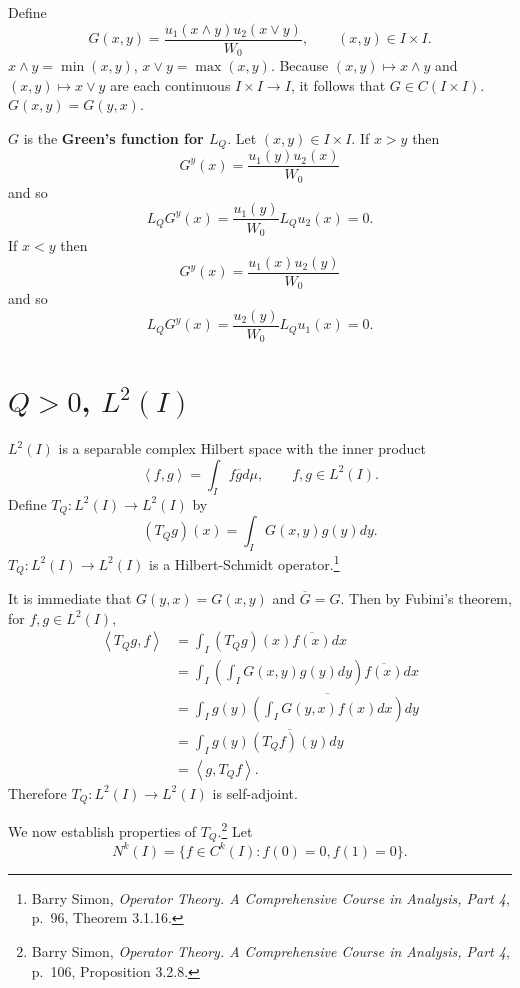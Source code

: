 \documentclass{article}
\newcommand{\inner}[2]{\left\langle #1, #2 \right\rangle}
\theoremstyle{definition}
\begin{document}
Define 
\[
G(x,y) = \frac{u_1(x \wedge y) u_2(x \vee y)}{W_0},\qquad (x,y) \in I \times I.
\]
$x \wedge y=\min(x,y)$, $x \vee y = \max(x,y)$. 
Because $(x,y) \mapsto x \wedge y$ and $(x,y) \mapsto x \vee y$ are each continuous
$I \times I \to I$, it follows that $G \in C(I \times I)$. 
$G(x,y) = G(y,x)$. 

$G$ is
the \textbf{Green's function for $L_Q$}.
Let $(x,y) \in I \times I$.
If $x>y$ then 
\[
G^y(x) = \frac{u_1(y) u_2(x)}{W_0}
\]
and so
\[
L_Q G^y(x) = \frac{u_1(y)}{W_0} L_Q u_2(x) = 0.
\]
If $x<y$ then
\[
G^y(x) = \frac{u_1(x)u_2(y)}{W_0}
\]
and so
\[
L_Q G^y(x) = \frac{u_2(y)}{W_0} L_Q u_1(x) = 0.
\]



\section{$Q>0$, $L^2(I)$}
$L^2(I)$ is a separable complex Hilbert space with the inner product
\[
\inner{f}{g} = \int_I f \overline{g} d\mu,\qquad f,g \in L^2(I).
\]
Define $T_Q:L^2(I) \to L^2(I)$ by
\[
(T_Q g)(x) = \int_I G(x,y) g(y) dy.
\]
$T_Q:L^2(I) \to L^2(I)$ is a Hilbert-Schmidt operator.\footnote{Barry Simon, {\em Operator Theory. A Comprehensive Course in Analysis, Part 4},
p.~96, Theorem 3.1.16.}

It is immediate that $G(y,x)=G(x,y)$ and $\overline{G}=G$.
Then 
by Fubini's theorem,  for $f,g \in L^2(I)$,
\begin{align*}
\inner{T_Qg}{f}&=\int_I (T_Q g)(x) \overline{f(x)} dx\\
&=\int_I \left( \int_I G(x,y) g(y) dy\right) \overline{f(x)} dx\\
&=\int_I g(y)\overline{\left(\int_I G(y,x) f(x) dx \right)} dy\\
&=\int_I g(y) \overline{(T_Q f)(y)}dy\\
&=\inner{g}{T_Q f}.
\end{align*}
Therefore $T_Q:L^2(I) \to L^2(I)$ is self-adjoint.

We now establish properties of $T_Q$.\footnote{Barry Simon, {\em Operator Theory. A Comprehensive Course in Analysis, Part 4},
p.~106, Proposition 3.2.8.}
Let
\[
N^k(I) = \{f \in C^k(I): f(0)=0, f(1)=0\}.
\]
\end{document}
